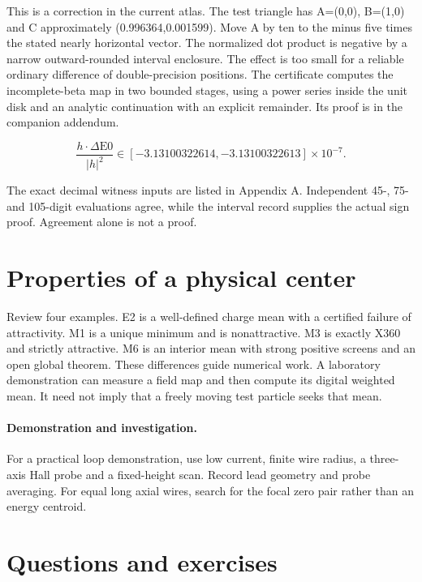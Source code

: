 \documentclass[11pt,oneside,openany]{book}
\begin{document}
This is a correction in the current atlas. The test triangle has A=(0,0), B=(1,0) and C approximately (0.996364,0.001599). Move A by ten to the minus five times the stated nearly horizontal vector. The normalized dot product is negative by a narrow outward-rounded interval enclosure. The effect is too small for a reliable ordinary difference of double-precision positions. The certificate computes the incomplete-beta map in two bounded stages, using a power series inside the unit disk and an analytic continuation with an explicit remainder. Its proof is in the companion addendum.


\[\frac{h\cdot\Delta\mathrm{E0}}{|h|^2}\in[-3.13100322614,-3.13100322613]\times10^{-7}.\]


The exact decimal witness inputs are listed in Appendix A.
Independent 45-, 75- and 105-digit evaluations agree, while the interval
record supplies the actual sign proof. Agreement alone is not a proof.



\section{Properties of a physical center}\label{sec:slide30}

Review four examples. E2 is a well-defined charge mean with a certified failure of attractivity. M1 is a unique minimum and is nonattractive. M3 is exactly X360 and strictly attractive. M6 is an interior mean with strong positive screens and an open global theorem. These differences guide numerical work. A laboratory demonstration can measure a field map and then compute its digital weighted mean. It need not imply that a freely moving test particle seeks that mean.



\paragraph{Demonstration and investigation.} For a practical loop demonstration, use low current, finite wire radius, a three-axis Hall probe and a fixed-height scan. Record lead geometry and probe averaging. For equal long axial wires, search for the focal zero pair rather than an energy centroid.


\section*{Questions and exercises}
\end{document}
